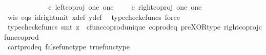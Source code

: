 \begin{isabellebody}
\ \ \ \ \ \ \isamarkupfalse%
\ \isamarkupfalse%
\ {\isachardoublequoteopen}{\isasymlangle}{\isasymt}{\isacharcomma}{\kern0pt}{\isasymf}{\isasymrangle}\ {\isasymamalg}\ {\isasymlangle}{\isasymf}{\isacharcomma}{\kern0pt}{\isasymt}{\isasymrangle}\ {\isasymcirc}\isactrlsub c\ left{\isacharunderscore}{\kern0pt}coproj\ one\ one\ {\isacharequal}{\kern0pt}\ {\isasymlangle}{\isasymt}{\isacharcomma}{\kern0pt}{\isasymf}{\isasymrangle}\ {\isasymamalg}\ {\isasymlangle}{\isasymf}{\isacharcomma}{\kern0pt}{\isasymt}{\isasymrangle}\ {\isasymcirc}\isactrlsub c\ right{\isacharunderscore}{\kern0pt}coproj\ one\ one{\isachardoublequoteclose}\isanewline
\ \ \ \ \ \ \ \ \isamarkupfalse%
\ w{\isacharunderscore}{\kern0pt}is\ eqs\ id{\isacharunderscore}{\kern0pt}right{\isacharunderscore}{\kern0pt}unit{}\ x{\isacharunderscore}{\kern0pt}def\ y{\isacharunderscore}{\kern0pt}def\ \isamarkupfalse%
\ {\isacharparenleft}{\kern0pt}typecheck{\isacharunderscore}{\kern0pt}cfuncs{\isacharcomma}{\kern0pt}\ force{\isacharparenright}{\kern0pt}\isanewline
\ \ \ \ \ \ \isamarkupfalse%
\ \isamarkupfalse%
\ {\isachardoublequoteopen}{\isasymlangle}{\isasymt}{\isacharcomma}{\kern0pt}{\isasymf}{\isasymrangle}\ {\isacharequal}{\kern0pt}\ {\isasymlangle}{\isasymf}{\isacharcomma}{\kern0pt}{\isasymt}{\isasymrangle}{\isachardoublequoteclose}\isanewline
\ \ \ \ \ \ \ \ \isamarkupfalse%
\ {\isacharparenleft}{\kern0pt}typecheck{\isacharunderscore}{\kern0pt}cfuncs{\isacharcomma}{\kern0pt}\ smt\ {\isacharparenleft}{\kern0pt}z{}{\isacharparenright}{\kern0pt}\ \ cfunc{\isacharunderscore}{\kern0pt}coprod{\isacharunderscore}{\kern0pt}unique\ coprod{\isacharunderscore}{\kern0pt}eq{}\ pre{\isacharunderscore}{\kern0pt}XOR{\isacharunderscore}{\kern0pt}type\ right{\isacharunderscore}{\kern0pt}coproj{\isacharunderscore}{\kern0pt}cfunc{\isacharunderscore}{\kern0pt}coprod{\isacharparenright}{\kern0pt}\ \ \ \ \ \ \isanewline
\ \ \ \ \ \ \isamarkupfalse%
\ \isamarkupfalse%
\ {\isachardoublequoteopen}{\isasymt}\ {\isacharequal}{\kern0pt}\ {\isasymf}\ {\isasymand}\ {\isasymf}\ {\isacharequal}{\kern0pt}\ {\isasymt}{\isachardoublequoteclose}\isanewline
\ \ \ \ \ \ \ \ \isamarkupfalse%
\ cart{\isacharunderscore}{\kern0pt}prod{\isacharunderscore}{\kern0pt}eq{}\ false{\isacharunderscore}{\kern0pt}func{\isacharunderscore}{\kern0pt}type\ true{\isacharunderscore}{\kern0pt}func{\isacharunderscore}{\kern0pt}type\ \isamarkupfalse%

\end{isabellebody}
